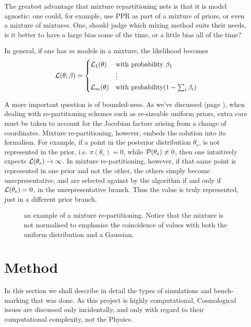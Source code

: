 \documentclass[usenatbib]{mnras}
\begin{document}
The greatest advantage that mixture repartitioning nets is
that it is model agnostic: one could, for example, use PPR as
part of a mixture of priors, or even a mixture of
mixtures. One, should judge which mixing method suits their
needs, is it better to have a large bias some of the time, or
a little bias all of the time?

In general,  if one has \(m\) models in a mixture, the likelihood becomes 
\begin{equation}
  {\cal L}(\theta; \beta)  = \begin{cases}
	{\cal L}_{1}(\theta) &  \text{with probability } \beta_{1}\\
		    &\vdots\\
	{\cal L}_{m}(\theta) & \text{with probability} (1- \sum_{i}\beta_{i})
	\end{cases}
\end{equation}


A more important question is of bounded-ness. As we've discussed
(page \pageref{domain-discussion}), when dealing with re-partitioning
schemes such as re-sizeable uniform priors, extra care must be
taken to account for the Jacobian factors arising from a change of
coordinates. Mixture re-partitioning, however, embeds the solution
into its formalism. For example, if a point in the posterior
distribution \(\theta_{e}\), is not represented in the prior, i.e.
\(\pi(\theta_{e}) = 0\), while \({\cal P}(\theta_{e}) \ne 0\), then
one intuitively expects \({\cal L}(\theta_{e}) \rightarrow
	\infty\). In mixture re-partitioning, however, if that same point is
represented in one prior and not the other, the others simply
become unrepresentative, and are selected against by the algorithm
if and only if \({\cal L}(\theta_{e}) = 0\), in the unrepresentative
branch. Thus the value is truly represented, just in a different
prior branch.

\begin{figure}
 
\caption{\label{org5b167b7}
an example of a mixture re-partitioning. Notice that the mixture is not normalised to emphasise the coincidence of values with both the uniform distribution and a Gaussian.}
\end{figure}



\section{Method}
\label{sec:orga09d21b}
In this section we shall describe in detail the types of simulations
and bench-marking that was done. As this project is highly
computational, Cosmological issues are discussed only incidentally,
and only with regard to their computational complexity, not the
Physics.
\end{document}
